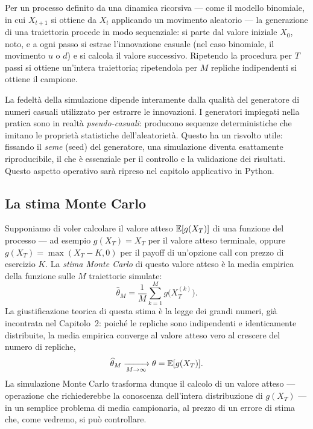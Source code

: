 Per un processo definito da una dinamica ricorsiva --- come il modello
binomiale, in cui $X_{t+1}$ si ottiene da $X_t$ applicando un
movimento aleatorio --- la generazione di una traiettoria procede in
modo sequenziale: si parte dal valore iniziale $X_0$, noto, e a ogni
passo si estrae l'innovazione casuale (nel caso binomiale, il
movimento $u$ o $d$) e si calcola il valore successivo. Ripetendo la
procedura per $T$ passi si ottiene un'intera traiettoria; ripetendola
per $M$ repliche indipendenti si ottiene il campione.

\begin{remark}
La fedelt\`{a} della simulazione dipende interamente dalla qualit\`{a}
del generatore di numeri casuali utilizzato per estrarre le
innovazioni. I generatori impiegati nella pratica sono in realt\`{a}
\emph{pseudo-casuali}: producono sequenze deterministiche che
imitano le propriet\`{a} statistiche dell'aleatoriet\`{a}. Questo ha
un risvolto utile: fissando il \emph{seme} (seed) del generatore, una
simulazione diventa esattamente riproducibile, il che \`{e}
essenziale per il controllo e la validazione dei risultati. Questo
aspetto operativo sar\`{a} ripreso nel capitolo applicativo in Python.
\end{remark}

\subsection{La stima Monte Carlo}

\noindent
Supponiamo di voler calcolare il valore atteso $\mathbb{E}[g(X_T)]$ di una
funzione del processo --- ad esempio $g(X_T)=X_T$ per il valore atteso
terminale, oppure $g(X_T)=\max(X_T-K,0)$ per il payoff di un'opzione
call con prezzo di esercizio $K$. La \emph{stima Monte Carlo} di
questo valore atteso \`{e} la media empirica della funzione sulle $M$
traiettorie simulate:
\[
\widehat{\theta}_M=\frac{1}{M}\sum_{k=1}^{M}g\bigl(X_T^{(k)}\bigr).
\]
La giustificazione teorica di questa stima \`{e} la legge dei grandi
numeri, gi\`{a} incontrata nel Capitolo~2: poich\'{e} le repliche sono
indipendenti e identicamente distribuite, la media empirica converge
al valore atteso vero al crescere del numero di repliche,
\[
\widehat{\theta}_M\xrightarrow[M\to\infty]{}\theta=\mathbb{E}[g(X_T)].
\]
La simulazione Monte Carlo trasforma dunque il calcolo di un valore
atteso --- operazione che richiederebbe la conoscenza dell'intera
distribuzione di $g(X_T)$ --- in un semplice problema di media
campionaria, al prezzo di un errore di stima che, come vedremo,
si pu\`{o} controllare.

